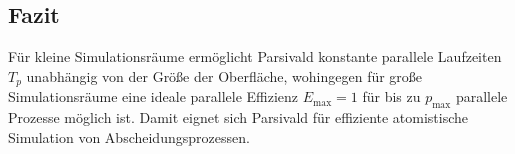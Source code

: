 \subsection{Fazit}

Für kleine Simulationsräume ermöglicht Parsivald konstante parallele Laufzeiten $T_p$ unabhängig von der Größe der Oberfläche, wohingegen für große Simulationsräume eine ideale parallele Effizienz $E_\text{max} = 1$ für bis zu $p_\text{max}$ parallele Prozesse möglich ist.
Damit eignet sich Parsivald für effiziente atomistische Simulation von Abscheidungsprozessen.


